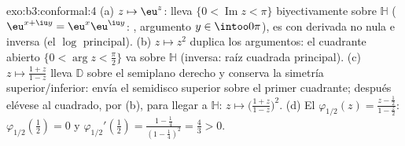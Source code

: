 \begin{solution}{exo:b3:conformal:4}
(a) $z \mapsto \eu^z$: lleva $\{0 < \operatorname{Im}z <
\pi\}$ biyectivamente sobre $\mathbb H$ ($\eu^{x+\iu y} =
\eu^x\eu^{\iu y}$: , argumento $y \in
\intoo0\pi$), es  con
derivada no nula e inversa 
(el $\log$ principal). (b) $z \mapsto z^2$ duplica los argumentos: el
cuadrante abierto $\{0 < \arg z < \frac\pi2\}$ va
 sobre $\mathbb
H$ (inversa: raíz cuadrada principal). (c)
$z \mapsto \frac{1 + z}{1 - z}$ lleva $\mathbb D$ sobre el semiplano
derecho y conserva la simetría superior/inferior: envía el semidisco
superior sobre el primer cuadrante; después elévese al cuadrado, por
(b), para llegar a $\mathbb H$: $z \mapsto \bigl(\frac{1
+ z}{1 - z}\bigr)^2$. (d) El  $\varphi_{1/2}(z) = \frac{z -
\frac12}{1 - \frac z2}$: $\varphi_{1/2}(\tfrac12) = 0$ y
$\varphi_{1/2}'(\tfrac12) = \frac{1 - \frac14}{(1 -
\frac14)^2} = \frac43 > 0$.
\end{solution}

